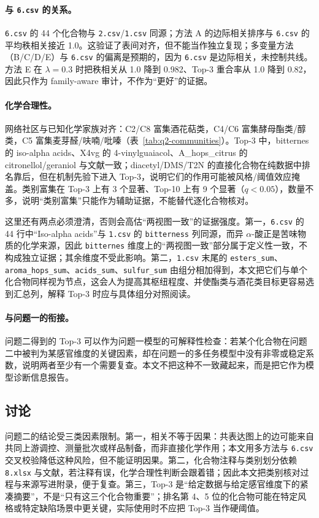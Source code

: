 \paragraph{与 \texttt{6.csv} 的关系。}\texttt{6.csv} 的 44 个化合物与 \texttt{2.csv}/\texttt{1.csv} 同源；方法 A 的边际相关排序与 \texttt{6.csv} 的平均秩相关接近 1.0。这验证了表间对齐，但不能当作独立复现；多变量方法（B/C/D/E）与 \texttt{6.csv} 的偏离是预期的，因为 \texttt{6.csv} 是边际相关，未控制共线。方法 E 在 $\lambda=0.3$ 时把秩相关从 1.0 降到 0.982、Top-3 重合率从 1.0 降到 0.82，因此只作为 family-aware 审计，不作为“更好”的证据。

\paragraph{化学合理性。}网络社区与已知化学家族对齐：C2/C8 富集酒花萜类，C4/C6 富集酵母酯类/醇类，C5 富集麦芽醛/呋喃/吡嗪（表~\ref{tab:q2-communities}）。Top-3 中，bitternes 的 iso-alpha acids、X4vg 的 4-vinylguaiacol、A\_hops\_citrus 的 citronellol/geraniol 与文献一致；diacetyl/DMS/T2N 的直接化合物在纯数据中排名靠后，但在机制先验下进入 Top-3，说明它们的作用可能被风格/阈值效应掩盖。类别富集在 Top-3 上有 3 个显著、Top-10 上有 9 个显著（$q<0.05$），数量不多，说明“类别富集”只能作为辅助证据，不能替代逐化合物核对。

这里还有两点必须澄清，否则会高估“两视图一致”的证据强度。第一，\texttt{6.csv} 的 44 行中“Iso-alpha acids”与 \texttt{1.csv} 的 \texttt{bitterness} 列同源，而异 $\alpha$-酸正是苦味物质的化学来源，因此 \texttt{bitternes} 维度上的“两视图一致”部分属于定义性一致，不构成独立证据；其余维度不受此影响。第二，\texttt{1.csv} 末尾的 \texttt{esters\_sum}、\texttt{aroma\_hops\_sum}、\texttt{acids\_sum}、\texttt{sulfur\_sum} 由组分相加得到，本文把它们与单个化合物同样视为节点，这会人为提高其枢纽程度、并使酯类与酒花类目标更容易选到汇总列，解释 Top-3 时应与具体组分对照阅读。

\paragraph{与问题一的衔接。}问题二得到的 Top-3 可以作为问题一模型的可解释性检查：若某个化合物在问题二中被判为某感官维度的关键因素，却在问题一的多任务模型中没有非零或稳定系数，说明两者至少有一个需要复查。本文不把这种不一致藏起来，而是把它作为模型诊断信息报告。

\subsection{讨论}

问题二的结论受三类因素限制。第一，相关不等于因果：共表达图上的边可能来自共同上游调控、测量批次或样品制备，而非直接化学作用；本文用多方法与 \texttt{6.csv} 交叉校验降低这种风险，但不能证明因果。第二，化合物注释与类别划分依赖 \texttt{8.xlsx} 与文献，若注释有误，化学合理性判断会跟着错；因此本文把类别核对过程与来源写进附录，便于复查。第三，Top-3 是“给定数据与给定感官维度下的紧凑摘要”，不是“只有这三个化合物重要”；排名第 4、5 位的化合物可能在特定风格或特定缺陷场景中更关键，实际使用时不应把 Top-3 当作硬阈值。
